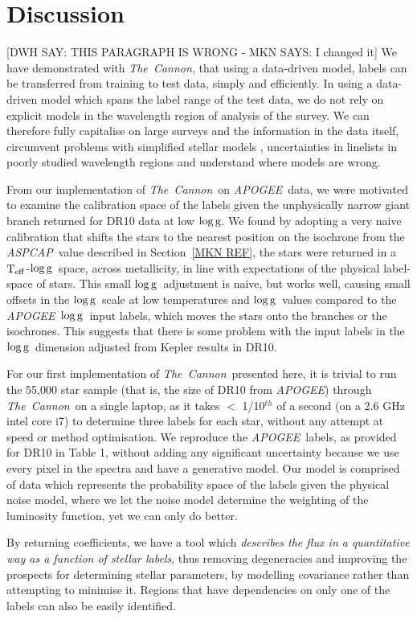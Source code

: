 \documentclass[12pt, preprint]{aastex}
\newcommand{\sectionname}{Section}
\newcommand{\tc}{\textsl{The~Cannon}}
\newcommand{\apogee}{\textsl{APOGEE}}
\newcommand{\aspcap}{\textsl{ASPCAP}}
\newcommand{\teff}{\mbox{$\rm T_{eff}$}}
\newcommand{\logg}{\mbox{$\rm \log g$}}
\begin{document}
\section{Discussion}

[DWH SAY: THIS PARAGRAPH IS WRONG - MKN SAYS: I changed it] We have demonstrated with \tc,  that using a data-driven model, labels can be transferred from training to test data, simply and efficiently. 
In using a data-driven model which spans the label range of the test data, we do not rely on explicit models in the wavelength region of analysis of the survey. 
We can therefore fully capitalise on large surveys and the information in the data itself, circumvent problems with simplified stellar models , uncertainties in linelists in poorly studied wavelength regions and understand where models are wrong.  

From our implementation of \tc\ on \apogee\ data, we were motivated to examine the calibration space of the labels given the unphysically narrow giant branch returned for DR10 data at low \logg. 
We found by adopting a very naive calibration that shifts the stars to the nearest position on the isochrone from the \aspcap\ value described in \sectionname~\ref{MKN REF}, the stars were returned in a \teff-\logg\ space, across metallicity, in line with expectations of the physical label-space of stars. 
This small \logg\ adjustment is naive, but works well, causing small offsets in the \logg\ scale at low temperatures and \logg\ values compared to the \apogee\ \logg\ input labels, which moves the stars onto the branches or the isochrones. 
This suggests that there is some problem with the input labels in the \logg\ dimension adjusted from Kepler results in DR10. 

For our first implementation of \tc\ presented here, it is trivial to run the 55,000 star sample (that is, the size of DR10 from \apogee) through \tc\ on a single laptop, as it takes $<$ 1/10$^{th}$ of a second (on a 2.6 GHz intel core i7) to determine three labels for each star, without any attempt at speed or method optimisation. 
We reproduce the \apogee\ labels, as provided for DR10 in Table 1, without adding any significant uncertainty because we use every pixel in the spectra and have a generative model. 
Our model is comprised of data which represents the probability space of the labels given the physical noise model,  where we let the noise model determine the weighting of the luminosity function, yet we can only do better. 

By returning coefficients, we have a tool which \textit{describes the flux in a quantitative way as a function of stellar labels}, thus removing degeneracies and improving the prospects for determining stellar parameters, by modelling covariance rather than attempting to minimise it. Regions that have dependencies on only one of the labels can also be easily identified. 
\end{document}
